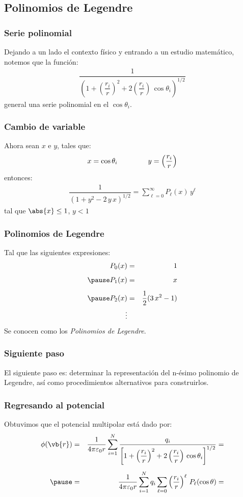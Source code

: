 \subsection{Polinomios de Legendre}
\begin{frame}
\frametitle{Serie polinomial}
Dejando a un lado el contexto físico y entrando a un estudio matemático, notemos que la función:
\begin{align*}
\dfrac{1}{\left( 1 + \left( \dfrac{r_{i}}{r} \right)^{2} + 2 \left( \dfrac{r_{i}}{r} \right) \, \cos \theta_{i} \right)^{1/2}}
\end{align*}
general una serie polinomial en el $\cos \theta_{i}$.
\end{frame}
\begin{frame}
\frametitle{Cambio de variable}
Ahora sean $x$ e $y$, tales que:
\begin{align*}
x = \cos \theta_{i} \hspace{1.5cm} y = \left( \dfrac{r_{i}}{r} \right)
\end{align*}
entonces:
\pause
\begin{align*}
\dfrac{1}{(1 + y^{2} - 2 \, y \, x)^{1/2}} = \sum_{\ell=0}^{\infty} P_{\ell} (x) \, y^{\ell}
\end{align*}
tal que $\abs{x} \leq 1$, $y < 1$
\end{frame}
\begin{frame}
\frametitle{Polinomios de Legendre}
Tal que las siguientes expresiones:
\begin{eqnarray*}
P_{0} (x) &=& 1 \\[0.5em] \pause
P_{1} (x) &=& x \\[0.5em] \pause
P_{2} (x) &=& \dfrac{1}{2} (3 \, x^{2} - 1) \\
\vdots
\end{eqnarray*}
\pause
Se conocen como los \emph{Polinomios de Legendre}.
\end{frame}
\begin{frame}
\frametitle{Siguiente paso}
El siguiente paso es: determinar la representación del n-ésimo polinomio de Legendre, así como procedimientos alternativos para construirlos.
\end{frame}
\begin{frame}
\frametitle{Regresando al potencial}
Obtuvimos que el potencial multipolar está dado por:
\begin{eqnarray*}
\phi(\vb{r}) &=& \dfrac{1}{4 \pi \varepsilon_{0} r} \sum_{i=1}^{N} \dfrac{q_{i}}{\left[ 1 + \left( \dfrac{r_{i}}{r} \right)^{2} + 2 \left( \dfrac{r_{i}}{r} \right) \, \cos \theta_{i} \right]^{1/2}} = \\[0.5em] \pause
&=& \dfrac{1}{4 \pi \varepsilon_{0} r} \sum_{i=1}^{N} q_{i} \sum_{\ell=0} \left( \dfrac{r_{i}}{r} \right)^{\ell} \, P_{\ell} (\cos \theta) =
\end{eqnarray*}
\end{frame}
